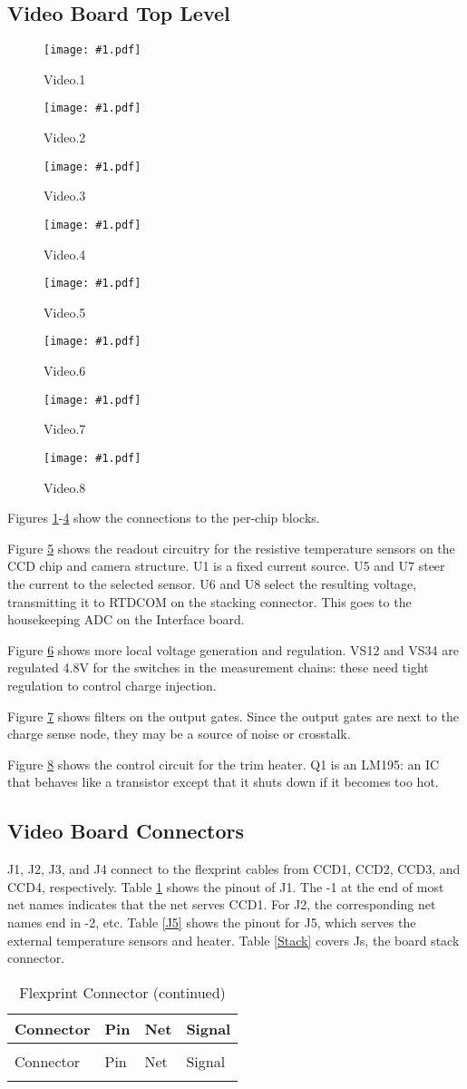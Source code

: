 \documentclass[12pt]{article}
\let\oldsubsection\subsection
\renewcommand{\subsection}{\FloatBarrier\oldsubsection}
\newcommand{\schempage}[1]{
   \begin{figure}[ht!]
   \centerline{\texttt{[image: \#1.pdf]}}
    \caption{#1}
    \label{#1}
    \end{figure}
}
\begin{document}
\subsection{Video Board Top Level}
\schempage{Video.1}
\schempage{Video.2}
\schempage{Video.3}
\schempage{Video.4}
\schempage{Video.5}
\schempage{Video.6}
\schempage{Video.7}
\schempage{Video.8}
Figures \ref{Video.1}-\ref{Video.4} show the connections to the per-chip blocks.

Figure \ref{Video.5} shows the readout circuitry for the resistive temperature sensors on the CCD chip and camera structure. U1 is a fixed current source. U5 and U7 steer the current to the selected sensor. U6 and U8 select the resulting voltage, transmitting it to RTDCOM on the stacking connector. This goes to the housekeeping ADC on the Interface board.

Figure \ref{Video.6} shows more local voltage generation and regulation. VS12 and VS34 are regulated 4.8V for the switches in the measurement chains: these need tight regulation to control charge injection.

Figure \ref{Video.7} shows filters on the output gates. Since the output gates are next to the charge sense node, they may be a source of noise or crosstalk.

Figure \ref{Video.8} shows the control circuit for the trim heater. Q1 is an LM195: an IC that behaves like a transistor except that it shuts down if it becomes too hot.

\subsection{Video Board Connectors}

J1, J2, J3, and J4 connect to the flexprint cables from CCD1, CCD2, CCD3, and CCD4, respectively. Table \ref{J1} shows the pinout of J1. The -1 at the end of most net names indicates that the net serves CCD1. For J2, the corresponding net names end in -2, etc. Table \ref{J5} shows the pinout for J5, which serves the external temperature sensors and heater. Table \ref{Stack} covers Js, the board stack connector.

\begin{longtable}{|l|l|l|l|}
\caption{Flexprint Connector} \label{J1} \\
\hline
Connector & Pin & Net & Signal \\
\hline \endfirsthead
\caption{Flexprint Connector (continued)} \\
\hline 
Connector & Pin & Net & Signal \\
\hline
\endhead
\hline \endfoot

\end{longtable}
\end{document}
